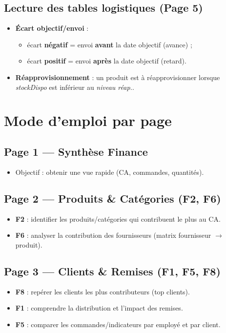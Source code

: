 \documentclass[a4paper,12pt]{article}
\begin{document}
\subsection{Lecture des tables logistiques (Page 5)}
\begin{itemize}[leftmargin=*]
  \item \textbf{Écart objectif/envoi} :
  \begin{itemize}
    \item écart \textbf{négatif} = envoi \textbf{avant} la date objectif (avance) ;
    \item écart \textbf{positif} = envoi \textbf{après} la date objectif (retard).
  \end{itemize}
  \item \textbf{Réapprovisionnement} : un produit est à réapprovisionner lorsque \textit{stockDispo} est inférieur au \textit{niveau réap.}.
\end{itemize}

\section{Mode d’emploi par page}

\subsection*{Page 1 — Synthèse Finance}
\begin{itemize}[leftmargin=*]
  \item Objectif : obtenir une vue rapide (CA, commandes, quantités).
\end{itemize}

\subsection*{Page 2 — Produits \& Catégories (F2, F6)}
\begin{itemize}[leftmargin=*]
  \item \textbf{F2} : identifier les produits/catégories qui contribuent le plus au CA.
  \item \textbf{F6} : analyser la contribution des fournisseurs (matrix fournisseur $\rightarrow$ produit).
\end{itemize}

\subsection*{Page 3 — Clients \& Remises (F1, F5, F8)}
\begin{itemize}[leftmargin=*]
  \item \textbf{F8} : repérer les clients les plus contributeurs (top clients).
  \item \textbf{F1} : comprendre la distribution et l’impact des remises.
  \item \textbf{F5} : comparer les commandes/indicateurs par employé et par client.
\end{itemize}
\end{document}
